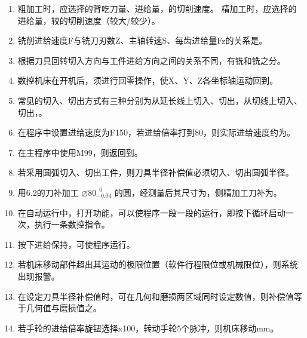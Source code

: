 \documentclass{HUNNUexam}
\begin{document}
\begin{enumerate} [1.]
	\item 粗加工时，应选择的背吃刀量、进给量，的切削速度。
	      精加工时，应选择的进给量，较的切削速度（较大/较少）。

	\item 铣削进给速度F与铣刀刃数Z、主轴转速S、每齿进给量Fz的关系是。

	\item 根据刀具回转切入方向与工件进给方向之间的关系不同，有铣和铣之分。

	\item 数控机床在开机后，须进行回零操作，使X、Y、Z各坐标轴运动回到。

	\item 常见的切入、切出方式有三种分别为从延长线上切入、切出，从切线上切入、切出，。

	\item 在程序中设置进给速度为F150，若进给倍率打到80，则实际进给速度约为。

	\item 在主程序中使用M99，则返回到。

	\item 若采用圆弧切入、切出工件，则刀具半径补偿值必须切入、切出圆弧半径。

	\item 用6.2的刀补加工 $\diameter 80^{~\;0}_{-0.04}$ 的圆，经测量后其尺寸为，侧精加工刀补为。

	\item 在自动运行中，打开功能，可以使程序一段一段的运行，即按下循环启动一次，执行一条数控指令。

	\item 按下进给保持，可使程序运行。

	\item 若机床移动部件超出其运动的极限位置（软件行程限位或机械限位），则系统出现报警。

	\item 在设定刀具半径补偿值时，可在几何和磨损两区域同时设定数值，则补偿值等于几何值与磨损值之。

	\item 若手轮的进给倍率旋钮选择x100，转动手轮5个脉冲，则机床移动mm。
\end{enumerate}
\end{document}
